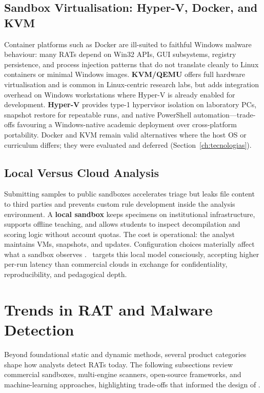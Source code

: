 \subsection{Sandbox Virtualisation: Hyper-V, Docker, and KVM}

Container platforms such as Docker are ill-suited to faithful Windows malware behaviour: many RATs
depend on Win32 APIs, GUI subsystems, registry persistence, and process injection patterns that
do not translate cleanly to Linux containers or minimal Windows images. \textbf{KVM/QEMU} offers
full hardware virtualisation and is common in Linux-centric research labs, but adds integration
overhead on Windows workstations where Hyper-V is already enabled for development. \textbf{Hyper-V}
provides type-1 hypervisor isolation on laboratory PCs, snapshot restore for repeatable runs, and
native PowerShell automation---trade-offs favouring a Windows-native academic deployment over
cross-platform portability. Docker and KVM remain valid alternatives where the host OS or
curriculum differs; they were evaluated and deferred (Section~\ref{ch:tecnologias}).

\subsection{Local Versus Cloud Analysis}

Submitting samples to public sandboxes accelerates triage but leaks file content to third parties
and prevents custom rule development inside the analysis environment. A \textbf{local sandbox}
keeps specimens on institutional infrastructure, supports offline teaching, and allows students to
inspect decompilation and scoring logic without account quotas. The cost is operational: the
analyst maintains VMs, snapshots, and updates. Configuration choices materially affect what a
sandbox observes \cite{alrawi2024}. \rat\ targets this local model consciously, accepting higher
per-run latency than commercial clouds in exchange for confidentiality, reproducibility, and
pedagogical depth.

\section{Trends in RAT and Malware Detection}

Beyond foundational static and dynamic methods, several product categories shape how analysts
detect RATs today. The following subsections review commercial sandboxes, multi-engine scanners,
open-source frameworks, and machine-learning approaches, highlighting trade-offs that informed the
design of \rat.

